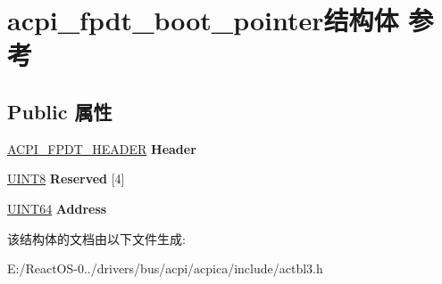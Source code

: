\hypertarget{structacpi__fpdt__boot__pointer}{}\section{acpi\+\_\+fpdt\+\_\+boot\+\_\+pointer结构体 参考}
\label{structacpi__fpdt__boot__pointer}
\subsection*{Public 属性}
\begin{DoxyCompactItemize}
\item 
\mbox{\label{structacpi__fpdt__boot__pointer_aa215b9b79e1accfa3a6cdb0fcdaff86f}} 
\hyperlink{structacpi__fpdt__header}{A\+C\+P\+I\+\_\+\+F\+P\+D\+T\+\_\+\+H\+E\+A\+D\+ER} {\bfseries Header}
\item 
\mbox{\label{structacpi__fpdt__boot__pointer_a451dc417508aa78fa86e6196b4dffa7b}} 
\hyperlink{_processor_bind_8h_ab27e9918b538ce9d8ca692479b375b6a}{U\+I\+N\+T8} {\bfseries Reserved} \mbox{[}4\mbox{]}
\item 
\mbox{\label{structacpi__fpdt__boot__pointer_ab3f0cfaced19c10a7aeacd9739b25369}} 
\hyperlink{_processor_bind_8h_a57be03562867144161c1bfee95ca8f7c}{U\+I\+N\+T64} {\bfseries Address}
\end{DoxyCompactItemize}


该结构体的文档由以下文件生成\+:\begin{DoxyCompactItemize}
\item 
E\+:/\+React\+O\+S-\/0../drivers/bus/acpi/acpica/include/actbl3.\+h\end{DoxyCompactItemize}
